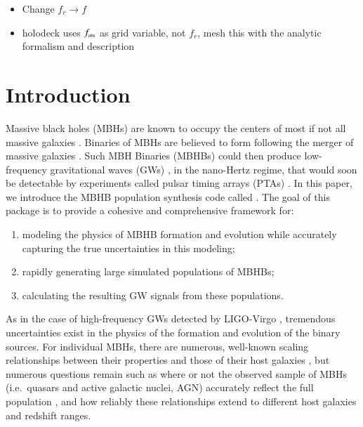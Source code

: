 
\begin{itemize}
    \item Change $f_r \rightarrow f$
    \item holodeck uses $f_\trt{obs}$ as grid variable, not $f_r$, mesh this with the analytic formalism and description
\end{itemize}


\section{Introduction}
    \label{sec:intro}

    Massive black holes (MBHs) are known to occupy the centers of most if not all massive galaxies \needcite{}.
    Binaries of MBHs are believed to form following the merger of massive galaxies \needcite{}.  Such MBH Binaries (MBHBs) could then produce low-frequency gravitational waves (GWs) , in the nano-Hertz regime, that would soon be detectable by experiments called pulsar timing arrays (PTAs) .  In this paper, we introduce the MBHB population synthesis code called \holodeck{}.  The goal of this package is to provide a cohesive and comprehensive framework for:
    \begin{enumerate}
        \item
        modeling the physics of MBHB formation and evolution while accurately capturing the true uncertainties in this modeling;
        \item
        rapidly generating large simulated populations of MBHBs;
        \item
        calculating the resulting GW signals from these populations.
    \end{enumerate}

    As in the case of high-frequency GWs detected by LIGO-Virgo \needcite{}, tremendous uncertainties exist in the physics of the formation and evolution of the binary sources.  For individual MBHs, there are numerous, well-known scaling relationships between their properties and those of their host galaxies , but numerous questions remain such as where or not the observed sample of MBHs (i.e.~quasars and active galactic nuclei, AGN) accurately reflect the full population , and how reliably these relationships extend to different host galaxies and redshift ranges.

